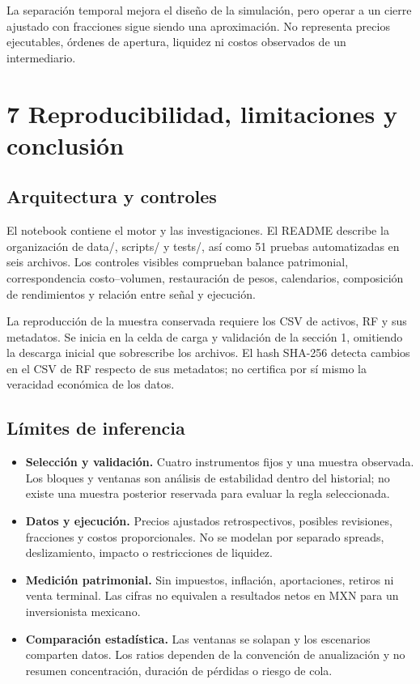 \documentclass[11pt,letterpaper]{article}
\begin{document}
La separación temporal mejora el diseño de la simulación, pero operar a un cierre ajustado con fracciones sigue siendo una aproximación. No representa precios ejecutables, órdenes de apertura, liquidez ni costos observados de un intermediario.


\clearpage

\section*{7 Reproducibilidad, limitaciones y conclusión}

\subsection*{Arquitectura y controles}

El notebook contiene el motor y las investigaciones. El README describe la organización de data/, scripts/ y tests/, así como 51 pruebas automatizadas en seis archivos. Los controles visibles comprueban balance patrimonial, correspondencia costo--volumen, restauración de pesos, calendarios, composición de rendimientos y relación entre señal y ejecución.

La reproducción de la muestra conservada requiere los CSV de activos, RF y sus metadatos. Se inicia en la celda de carga y validación de la sección 1, omitiendo la descarga inicial que sobrescribe los archivos. El hash SHA-256 detecta cambios en el CSV de RF respecto de sus metadatos; no certifica por sí mismo la veracidad económica de los datos.

\subsection*{Límites de inferencia}

\begin{itemize}

\item \textbf{Selección y validación.} Cuatro instrumentos fijos y una muestra observada. Los bloques y ventanas son análisis de estabilidad dentro del historial; no existe una muestra posterior reservada para evaluar la regla seleccionada.

\item \textbf{Datos y ejecución.} Precios ajustados retrospectivos, posibles revisiones, fracciones y costos proporcionales. No se modelan por separado spreads, deslizamiento, impacto o restricciones de liquidez.

\item \textbf{Medición patrimonial.} Sin impuestos, inflación, aportaciones, retiros ni venta terminal. Las cifras no equivalen a resultados netos en MXN para un inversionista mexicano.

\item \textbf{Comparación estadística.} Las ventanas se solapan y los escenarios comparten datos. Los ratios dependen de la convención de anualización y no resumen concentración, duración de pérdidas o riesgo de cola.

\end{itemize}
\end{document}
